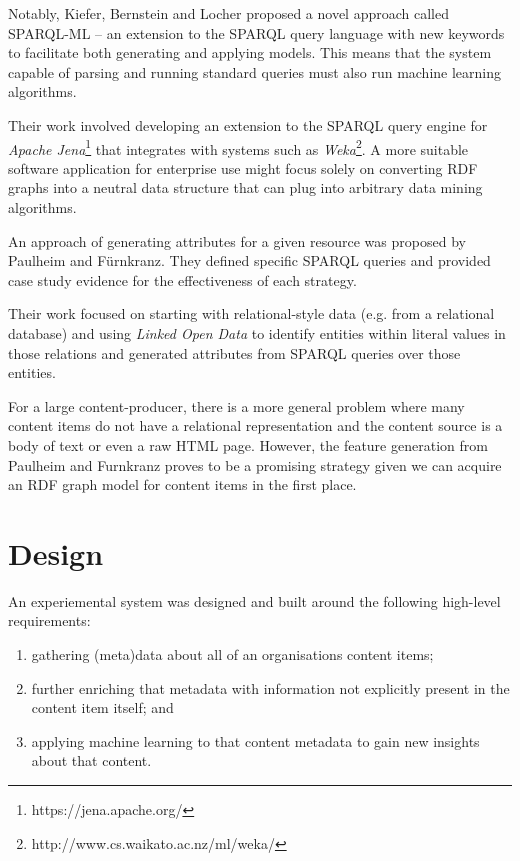 \documentclass{sig-alternate-05-2015}
\begin{document}
Notably, Kiefer, Bernstein and Locher\cite{kiefer2008adding} proposed a novel
approach called SPARQL-ML -- an extension to the
SPARQL\cite{segaran2009programming} query language with new keywords to
facilitate both generating and applying models. This means that the system
capable of parsing and running standard queries must also run machine learning
algorithms.

Their work involved developing an extension to the SPARQL query
engine for \emph{Apache Jena}\footnote{https://jena.apache.org/} that integrates
with systems such as \emph{Weka}\footnote{http://www.cs.waikato.ac.nz/ml/weka/}.
A more suitable software application for enterprise use might focus solely on
converting RDF graphs into a neutral data structure that can plug into arbitrary
data mining algorithms.

An approach of generating attributes for a given resource was proposed by
Paulheim and F\"urnkranz\cite{paulheim2012unsupervised}. They defined specific
SPARQL queries and provided case study evidence for the effectiveness of
each strategy.

Their work focused on starting with relational-style data (e.g. from a
relational database) and using \emph{Linked Open Data} to identify entities
within literal values in those relations and generated attributes from
SPARQL queries over those entities.

For a large content-producer, there is a more general problem where many content
items do not have a relational representation and the content source is a body
of text or even a raw HTML page. However, the feature generation from Paulheim
and F\:urnkranz proves to be a promising strategy given we can acquire an RDF
graph model for content items in the first place.

\section{Design}

An experiemental system was designed and built around the following
high-level requirements:

\begin{enumerate}
\item gathering (meta)data about all of an organisations content items;
\item further enriching that metadata with information not explicitly present
in the content item itself; and
\item applying machine learning to that content metadata to gain new insights
about that content.
\end{enumerate}
\end{document}
